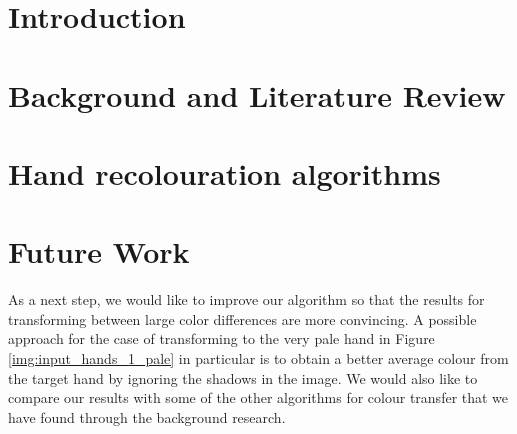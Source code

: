 \documentclass[12pt, a4paper]{article}
\begin{document}
\tableofcontents
\pagebreak

\listoffigures
\listoftables
\pagebreak

\renewcommand{\nomname}{List of Symbols}
\printnomenclature
\pagebreak

\section{Introduction}

\pagebreak

\section{Background and Literature Review}

\pagebreak

\section{Hand recolouration algorithms}

\pagebreak

\section{Future Work}
As a next step, we would like to improve our algorithm so that the results for transforming between large color differences are more convincing. A possible approach for the case of transforming to the very pale hand in Figure \ref{img:input_hands_1_pale} in particular is to obtain a better average colour from the target hand by ignoring the shadows in the image. We would also like to compare our results with some of the other algorithms for colour transfer that we have found through the background research.
\pagebreak



\pagebreak


% 

% 

% 
\end{document}
